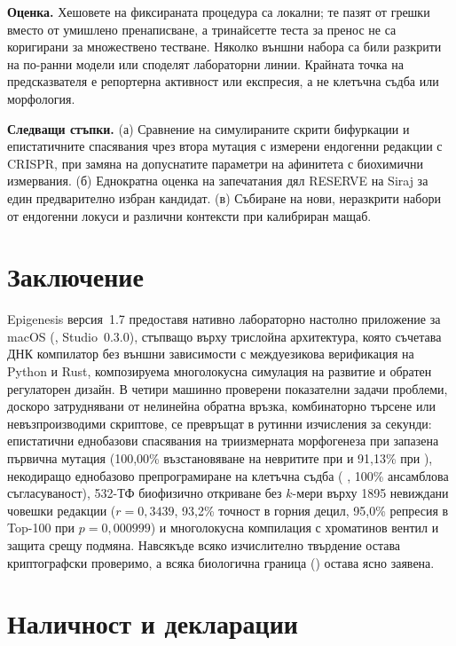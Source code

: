 \documentclass[10.5pt,a4paper]{article}
\begin{document}
\textbf{Оценка.} Хешовете на фиксираната процедура са локални; те пазят от грешки вместо от умишлено пренаписване, а тринайсетте теста за пренос не са коригирани за множествено тестване. Няколко външни набора са били разкрити на по-ранни модели или споделят лабораторни линии. Крайната точка на предсказвателя е репортерна активност или експресия, а не клетъчна съдба или морфология.

\textbf{Следващи стъпки.} (а) Сравнение на симулираните скрити бифуркации и епистатичните спасявания чрез втора мутация с измерени ендогенни редакции с CRISPR, при замяна на допуснатите параметри на афинитета с биохимични измервания. (б) Еднократна оценка на запечатания дял RESERVE на Siraj за един предварително избран кандидат. (в) Събиране на нови, неразкрити набори от ендогенни локуси и различни контексти при калибриран мащаб.

\section{Заключение}

Epigenesis версия~1.7 предоставя нативно лабораторно настолно приложение за macOS (, Studio~0.3.0), стъпващо върху трислойна архитектура, която съчетава ДНК компилатор без външни зависимости с междуезикова верификация на Python и Rust, композируема многолокусна симулация на развитие и обратен регулаторен дизайн. В четири машинно проверени показателни задачи проблеми, доскоро затруднявани от нелинейна обратна връзка, комбинаторно търсене или невъзпроизводими скриптове, се превръщат в рутинни изчисления за секунди: епистатични еднобазови спасявания на триизмерната морфогенеза при запазена първична мутация (100,00\% възстановяване на невритите при  и 91,13\% при ), некодиращо еднобазово препрограмиране на клетъчна съдба ( , 100\% ансамблова съгласуваност), 532-ТФ биофизично откриване без $k$-мери върху 1895 невиждани човешки редакции ($r=0{,}3439$, 93,2\% точност в горния децил, 95,0\% репресия в Top-100 при $p=0{,}000999$) и многолокусна компилация с хроматинов вентил и защита срещу подмяна. Навсякъде всяко изчислително твърдение остава криптографски проверимо, а всяка биологична граница () остава ясно заявена.

\section{Наличност и декларации}
\end{document}
